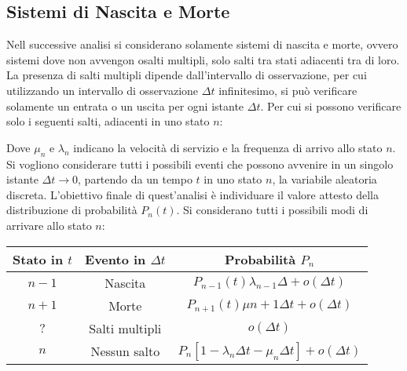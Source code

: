 \documentclass{article}
\numberwithin{equation}{subsection}
\begin{document}
\subsection{Sistemi di Nascita e Morte}

Nell successive analisi si considerano solamente sistemi di nascita e morte, ovvero sistemi dove non avvengon osalti multipli, solo salti tra stati adiacenti tra di loro. 
La presenza di salti multipli dipende dall'intervallo di osservazione, per cui utilizzando un intervallo di osservazione $\Delta t$ infinitesimo, si può verificare solamente 
un entrata o un uscita per ogni istante $\Delta t$. Per cui si possono verificare solo i seguenti salti, adiacenti in uno stato $n$:
\begin{center}
\end{center}
Dove $\mu_n$ e $\lambda_n$ indicano la velocità di servizio e la frequenza di arrivo allo stato $n$. Si vogliono considerare tutti i possibili eventi che possono 
avvenire in un singolo istante $\Delta t\to0$, partendo da un tempo $t$ in uno stato $n$, la variabile aleatoria discreta. L'obiettivo finale di quest'analisi è individuare 
il valore attesto della distribuzione di probabilità $P_n(t)$. Si considerano tutti i possibili modi di arrivare allo stato $n$:

\begin{center}
    \begin{tabular}{|c|c|c|}
        \hline
        Stato in $t$ & Evento in $\Delta t$ & Probabilità $P_n$ \\
        \hline
        $n-1$ & Nascita & $P_{n-1}(t)\lambda_{n-1}\Delta +o(\Delta t)$\\
        \hline
        $n+1$ & Morte & $P_{n+1}(t)\mu{n+1}\Delta t+o(\Delta t)$\\
        \hline
        $?$ & Salti multipli & $o(\Delta t)$\\
        \hline
        $n$ & Nessun salto & $P_n\left[1-\lambda_n\Delta t-\mu_n\Delta t\right]+o(\Delta t)$\\
        \hline
    \end{tabular} 
\end{center}
\end{document}
